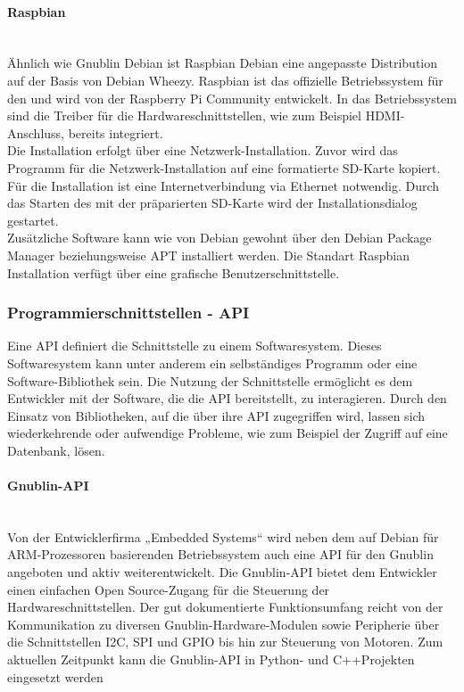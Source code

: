 \documentclass[../Bachelorarbeit.tex]{subfiles}
\begin{document}
\paragraph{Raspbian}\mbox{}\\ 
Ähnlich wie Gnublin Debian ist Raspbian Debian eine angepasste Distribution auf der 
Basis von Debian Wheezy. Raspbian ist das offizielle Betriebssystem für den 
und wird von der Raspberry Pi Community entwickelt. In das Betriebssystem sind die 
Treiber für die Hardwareschnittstellen, wie zum Beispiel HDMI-Anschluss, bereits 
integriert.\\
Die Installation erfolgt über eine Netzwerk-Installation. Zuvor wird das Programm für die Netzwerk-Installation auf eine formatierte SD-Karte kopiert. Für die Installation ist eine Internetverbindung via Ethernet notwendig. Durch das Starten des  mit der präparierten SD-Karte wird der Installationsdialog gestartet.\\
Zusätzliche Software kann wie von Debian gewohnt über den Debian Package Manager 
beziehungsweise \ac{APT} installiert werden. Die Standart Raspbian Installation verfügt über eine grafische Benutzerschnittstelle.

\subsubsection*{Programmierschnittstellen - \acf{API}}
Eine \acs{API} definiert die Schnittstelle zu einem Softwaresystem. Dieses Softwaresystem kann unter anderem ein selbständiges Programm oder eine Software-Bibliothek sein. Die Nutzung der Schnittstelle ermöglicht es dem Entwickler mit der Software, die die \acs{API} bereitstellt, zu interagieren. Durch den Einsatz von Bibliotheken, auf die über ihre \acs{API} zugegriffen wird, lassen sich wiederkehrende oder aufwendige Probleme, wie zum Beispiel der Zugriff auf eine Datenbank, lösen. 

\paragraph{Gnublin-\ac{API}}\mbox{}\\ 
\label{para:gnublin-api}
Von der Entwicklerfirma „Embedded Systems“ wird neben dem auf Debian für \ac{ARM}-Prozessoren basierenden Betriebssystem auch eine \acs{API} für den Gnublin angeboten und aktiv weiterentwickelt. Die Gnublin-API bietet dem Entwickler einen einfachen Open Source-Zugang für die Steuerung der Hardwareschnittstellen. Der gut dokumentierte Funktionsumfang reicht von der Kommunikation zu diversen Gnublin-Hardware-Modulen sowie Peripherie über die Schnittstellen \ac{I2C}, \ac{SPI} und \ac{GPIO} bis hin zur Steuerung von Motoren. 
Zum aktuellen Zeitpunkt kann die Gnublin-API in Python- und C++Projekten eingesetzt 
werden
\end{document}
